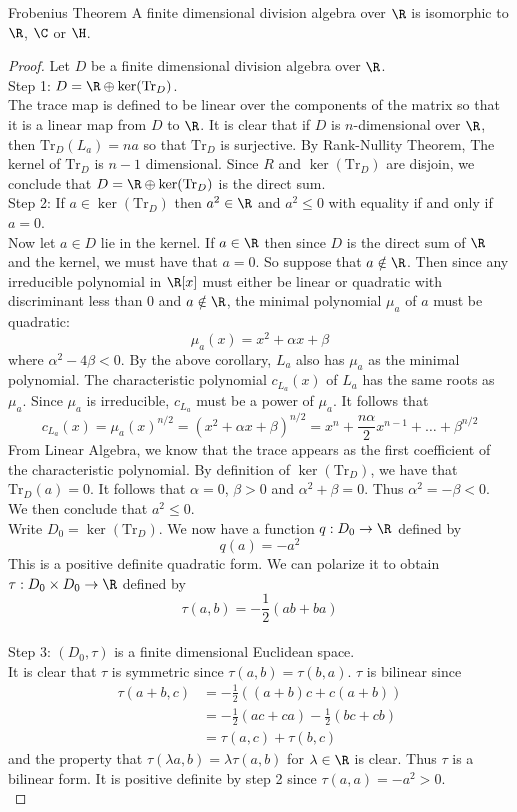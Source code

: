 \documentclass[a4paper]{article}
\begin{document}
\begin{thm}{Frobenius Theorem}{} A finite dimensional division algebra over $\R$ is isomorphic to $\R$, $\C$ or $\H$. 
\begin{proof}
Let $D$ be a finite dimensional division algebra over $\R$. \\

Step 1: $D=\R\oplus\ker(\text{Tr}_D)$. \\
The trace map is defined to be linear over the components of the matrix so that it is a linear map from $D$ to $\R$. It is clear that if $D$ is $n$-dimensional over $\R$, then $\text{Tr}_D(L_a)=na$ so that $\text{Tr}_D$ is surjective. By Rank-Nullity Theorem, The kernel of $\text{Tr}_D$ is $n-1$ dimensional. Since $R$ and $\ker(\text{Tr}_D)$ are disjoin, we conclude that $D=\R\oplus\ker(\text{Tr}_D)$ is the direct sum. \\

Step 2: If $a\in\ker(\text{Tr}_D)$ then $a^2\in\R$ and $a^2\leq 0$ with equality if and only if $a=0$. \\
Now let $a\in D$ lie in the kernel. If $a\in\R$ then since $D$ is the direct sum of $\R$ and the kernel, we must have that $a=0$. So suppose that $a\notin\R$. Then since any irreducible polynomial in $\R[x]$ must either be linear or quadratic with discriminant less than $0$ and $a\notin\R$, the minimal polynomial $\mu_a$ of $a$ must be quadratic: $$\mu_a(x)=x^2+\alpha x+\beta$$ where $\alpha^2-4\beta<0$. By the above corollary, $L_a$ also has $\mu_a$ as the minimal polynomial. The characteristic polynomial $c_{L_a}(x)$ of $L_a$ has the same roots as $\mu_a$. Since $\mu_a$ is irreducible, $c_{L_a}$ must be a power of $\mu_a$. It follows that $$c_{L_a}(x)=\mu_a(x)^{n/2}=(x^2+\alpha x+\beta)^{n/2}=x^n+\frac{n\alpha}{2}x^{n-1}+\dots+\beta^{n/2}$$ From Linear Algebra, we know that the trace appears as the first coefficient of the characteristic polynomial. By definition of $\ker(\text{Tr}_D)$, we have that $\text{Tr}_D(a)=0$. It follows that $\alpha=0$, $\beta>0$ and $\alpha^2+\beta=0$. Thus $\alpha^2=-\beta<0$. We then conclude that $a^2\leq 0$. \\

Write $D_0=\ker(\text{Tr}_D)$. We now have a function $q:D_0\to\R$ defined by $$q(a)=-a^2$$ This is a positive definite quadratic form. We can polarize it to obtain $\tau:D_0\times D_0\to\R$ defined by $$\tau(a,b)=-\frac{1}{2}(ab+ba)$$~\\

Step 3: $(D_0,\tau)$ is a finite dimensional Euclidean space. \\
It is clear that $\tau$ is symmetric since $\tau(a,b)=\tau(b,a)$. $\tau$ is bilinear since 
\begin{align*}
\tau(a+b,c)&=-\frac{1}{2}((a+b)c+c(a+b))\\
&=-\frac{1}{2}(ac+ca)-\frac{1}{2}(bc+cb)\\
&=\tau(a,c)+\tau(b,c)
\end{align*} and the property that $\tau(\lambda a,b)=\lambda\tau(a,b)$ for $\lambda\in\R$ is clear. Thus $\tau$ is a bilinear form. It is positive definite by step 2 since $\tau(a,a)=-a^2>0$. \\


\end{proof}
\end{thm}
\end{document}
